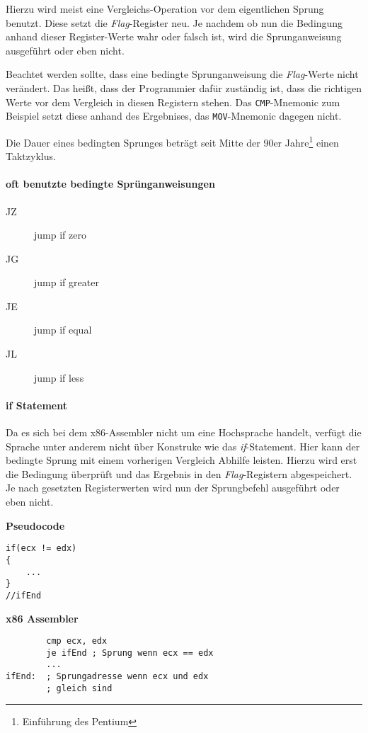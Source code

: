 Hierzu wird meist eine Vergleichs-Operation vor dem eigentlichen Sprung benutzt. Diese setzt die \textit{Flag}-Register neu. Je nachdem ob nun die Bedingung anhand dieser Register-Werte wahr oder falsch ist, wird die Sprunganweisung ausgeführt oder eben nicht. 

Beachtet werden sollte, dass eine bedingte Sprunganweisung die \textit{Flag}-Werte nicht verändert. Das heißt, dass der Programmier dafür zuständig ist, dass die richtigen Werte vor dem Vergleich in diesen Registern stehen. Das \texttt{CMP}-Mnemonic zum Beispiel setzt diese anhand des Ergebnises, das \texttt{MOV}-Mnemonic dagegen nicht.

Die Dauer eines bedingten Sprunges beträgt seit Mitte der 90er Jahre\footnote{Einführung des Pentium} einen Taktzyklus.

\paragraph{oft benutzte bedingte Sprünganweisungen}
\begin{description}
	\item [JZ] jump if zero
	\item [JG] jump if greater 
	\item [JE] jump if equal 
	\item [JL] jump if less 
\end{description}

\paragraph{if Statement}

Da es sich bei dem x86-Assembler nicht um eine Hochsprache handelt, verfügt die Sprache unter anderem nicht über Konstruke wie das \textit{if}-Statement.
Hier kann der bedingte Sprung mit einem vorherigen Vergleich Abhilfe leisten.
Hierzu wird erst die Bedingung überprüft und das Ergebnis in den \textit{Flag}-Registern abgespeichert.
Je nach gesetzten Registerwerten wird nun der Sprungbefehl ausgeführt oder eben nicht.

\textbf{Pseudocode}
\begin{lstlisting}
if(ecx != edx)
{
	...
}
//ifEnd
\end{lstlisting}

\textbf{x86 Assembler}
\begin{lstlisting}
        cmp ecx, edx
        je ifEnd ; Sprung wenn ecx == edx
        ...
ifEnd:  ; Sprungadresse wenn ecx und edx
        ; gleich sind 
\end{lstlisting}

